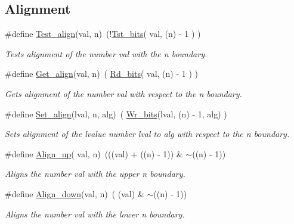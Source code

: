 \subsection*{Alignment}
\begin{DoxyCompactItemize}
\item 
\#define \mbox{\hyperlink{group__group__sam0__utils_gad490b657cb147d3d1773f6559559b98b}{Test\+\_\+align}}(val,  n)~(!\mbox{\hyperlink{group__group__sam0__utils_gab1e92741077b101e6b2df74880e71e96}{Tst\+\_\+bits}}( val, (n) -\/ 1     )   )
\begin{DoxyCompactList}\small\item\em Tests alignment of the number {\itshape val} with the {\itshape n} boundary. \end{DoxyCompactList}\item 
\#define \mbox{\hyperlink{group__group__sam0__utils_ga526bddb313be14057f5d65e199f6d814}{Get\+\_\+align}}(val,  n)~(  \mbox{\hyperlink{group__group__sam0__utils_ga53d9294b7065346ffa04d7991d2bc31e}{Rd\+\_\+bits}}( val, (n) -\/ 1     )   )
\begin{DoxyCompactList}\small\item\em Gets alignment of the number {\itshape val} with respect to the {\itshape n} boundary. \end{DoxyCompactList}\item 
\#define \mbox{\hyperlink{group__group__sam0__utils_gad607b0e4ad3cf4cb5bd7a3619742f092}{Set\+\_\+align}}(lval,  n,  alg)~(  \mbox{\hyperlink{group__group__sam0__utils_ga97b2bc0b5cdc7ec5293b7a5304cee0f0}{Wr\+\_\+bits}}(lval, (n) -\/ 1, alg)   )
\begin{DoxyCompactList}\small\item\em Sets alignment of the lvalue number {\itshape lval} to {\itshape alg} with respect to the {\itshape n} boundary. \end{DoxyCompactList}\item 
\#define \mbox{\hyperlink{group__group__sam0__utils_ga2bac987572902a9a7b69442541d78c42}{Align\+\_\+up}}( val,  n)~(((val) + ((n) -\/ 1)) \& $\sim$((n) -\/ 1))
\begin{DoxyCompactList}\small\item\em Aligns the number {\itshape val} with the upper {\itshape n} boundary. \end{DoxyCompactList}\item 
\#define \mbox{\hyperlink{group__group__sam0__utils_ga1070d94a69b4e1955ac1723b4f382095}{Align\+\_\+down}}(val,  n)~( (val)              \& $\sim$((n) -\/ 1))
\begin{DoxyCompactList}\small\item\em Aligns the number {\itshape val} with the lower {\itshape n} boundary. \end{DoxyCompactList}\end{DoxyCompactItemize}
